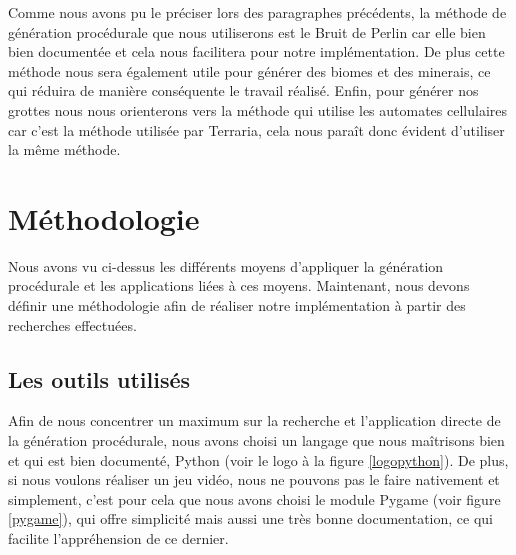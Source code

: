 \documentclass[12pt]{article}
\begin{document}
Comme nous avons pu le préciser lors des paragraphes précédents, la méthode de génération procédurale que nous utiliserons est le Bruit de Perlin car elle bien bien documentée et cela nous facilitera pour notre implémentation. De plus cette méthode nous sera également utile pour générer des biomes et des minerais, ce qui réduira de manière conséquente le travail réalisé. Enfin, pour générer nos grottes nous nous orienterons vers la méthode qui utilise les automates cellulaires car c'est la méthode utilisée par Terraria, cela nous paraît donc évident d'utiliser la même méthode. 
\newpage
\section{Méthodologie}

Nous avons vu ci-dessus les différents moyens d'appliquer la génération procédurale et les applications liées à ces moyens. Maintenant, nous devons définir une méthodologie afin de réaliser notre implémentation à partir des recherches effectuées.

\subsection{Les outils utilisés}

Afin de nous concentrer un maximum sur la recherche et l'application directe de la génération procédurale, nous avons choisi un langage que nous maîtrisons bien et qui est bien documenté, Python (voir le logo à la figure \ref{logopython}). De plus, si nous voulons réaliser un jeu vidéo, nous ne pouvons pas le faire nativement et simplement, c'est pour cela que nous avons choisi le module Pygame (voir figure \ref{pygame}), qui offre simplicité mais aussi une très bonne documentation, ce qui facilite l’appréhension de ce dernier.\par
\end{document}
